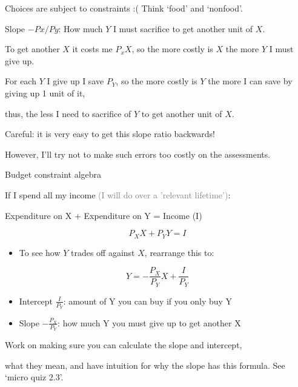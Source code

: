 \documentclass[table]{beamer}
\providecommand{\tightlist}{%
  \setlength{\itemsep}{0pt}\setlength{\parskip}{0pt}}
\begin{document}
\begin{frame}
\begin{block}{Choices are subject to constraints :(}
Think `food' and `nonfood'.

Slope \(-Px/Py\): How much \(Y\) I must sacrifice to get another unit of
\(X\).

To get another \(X\) it costs me \(P_xX\), so the more costly is \(X\)
the more \(Y\) I must give up.

For each \(Y\) I give up I save \(P_Y\), so the more costly is \(Y\) the
more I can save by giving up 1 unit of it,

thus, the less I need to sacrifice of \(Y\) to get another unit of
\(X\).

Careful: it is very easy to get this slope ratio backwards!

However, I'll try not to make such errors too costly on the assessments.

\end{block}

\end{frame}

\begin{frame}

\begin{block}{Budget constraint algebra}

If I spend all my income
\textcolor{gray}{(I will do over a 'relevant lifetime')}:

Expenditure on X + Expenditure on Y = Income (I)

\[P_X X + P_Y Y = I \]

\begin{itemize}[<+->]
\tightlist
\item
  To see how \(Y\) trades off against \(X\), rearrange this to:
\end{itemize}

\[Y = -\frac{P_X}{P_Y} X + \frac{I}{P_Y}\]

\begin{itemize}[<+->]
\tightlist
\item
  Intercept \(\frac{I}{P_Y}\): amount of Y you can buy if you only buy Y
\item
  Slope \(-\frac{P_X}{P_Y}\): how much Y you must give up to get another
  X
\end{itemize}

Work on making sure you can calculate the slope and intercept,

what they mean, and have intuition for why the slope has this formula.
See `micro quiz 2.3'.

\end{block}

\end{frame}
\end{document}
